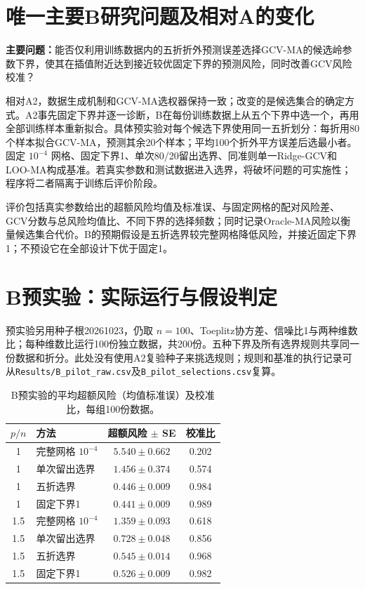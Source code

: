 \documentclass[UTF8,fontset=fandol,11pt,a4paper]{ctexart}
\begin{document}
\section{唯一主要B研究问题及相对A的变化}
\textbf{主要问题：}能否仅利用训练数据内的五折折外预测误差选择GCV-MA的候选岭参数下界，使其在插值附近达到接近较优固定下界的预测风险，同时改善GCV风险校准？

相对A2，数据生成机制和GCV-MA选权器保持一致；改变的是候选集合的确定方式。A2事先固定下界并逐一诊断，B在每份训练数据上从五个下界中选一个，再用全部训练样本重新拟合。具体预实验对每个候选下界使用同一五折划分：每折用80个样本拟合GCV-MA，预测其余20个样本；平均100个折外平方误差后选最小者。固定 $10^{-4}$ 网格、固定下界1、单次80/20留出选界、同准则单一Ridge-GCV和LOO-MA构成基准。若真实参数和测试数据进入选界，将破坏问题的可实施性；程序将二者隔离于训练后评价阶段。

评价包括真实参数给出的超额风险均值及标准误、与固定网格的配对风险差、GCV分数与总风险均值比、不同下界的选择频数；同时记录Oracle-MA风险以衡量候选集合代价。B的预期假设是五折选界较完整网格降低风险，并接近固定下界1；不预设它在全部设计下优于固定1。

\section{B预实验：实际运行与假设判定}
预实验另用种子根20261023，仍取 $n=100$、Toeplitz协方差、信噪比1与两种维数比；每种维数比运行100份独立数据，共200份。五种下界及所有选界规则共享同一份数据和折分。此处没有使用A2复验种子来挑选规则；规则和基准的执行记录可从\texttt{Results/B\_pilot\_raw.csv}及\texttt{B\_pilot\_selections.csv}复算。
\begin{table}[!htbp]\centering\small
\caption{B预实验的平均超额风险（均值标准误）及校准比，每组100份数据。}
\begin{tabular}{clcc}\toprule
$p/n$ & 方法 & 超额风险 $\pm$ SE & 校准比\\\midrule
1 & 完整网格 $10^{-4}$ & $5.540\pm0.662$ & 0.202\\
1 & 单次留出选界 & $1.456\pm0.374$ & 0.574\\
1 & 五折选界 & $0.446\pm0.009$ & 0.984\\
1 & 固定下界1 & $0.441\pm0.009$ & 0.989\\
1.5 & 完整网格 $10^{-4}$ & $1.359\pm0.093$ & 0.618\\
1.5 & 单次留出选界 & $0.728\pm0.048$ & 0.856\\
1.5 & 五折选界 & $0.545\pm0.014$ & 0.968\\
1.5 & 固定下界1 & $0.526\pm0.009$ & 0.982\\\bottomrule
\end{tabular}\label{tab:b}
\end{table}
\end{document}
